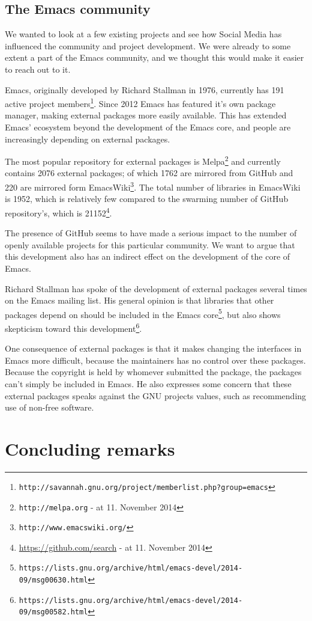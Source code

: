 \documentclass[a4paper,11pt]{article} %
\begin{document}
\subsection{The Emacs community}

We wanted to look at a few existing projects and see how Social Media has
influenced the community and project development. We were already to some
extent a part of the Emacs community, and we thought this would make it
easier to reach out to it.

Emacs, originally developed by Richard Stallman in 1976, currently has
\num{191} active project
members\footnote{\texttt{http://savannah.gnu.org/project/memberlist.php?group=emacs}}.
Since \num{2012} Emacs has featured it's own package manager, making
external packages more easily available. This has extended Emacs' ecosystem
beyond the development of the Emacs core, and people are increasingly
depending on external packages.

The most popular repository for external packages is
Melpa\footnote{\texttt{http://melpa.org} - at 11. November 2014} and
currently contains \num{2076} external packages; of which \num{1762} are
mirrored from GitHub and \num{220} are mirrored form
EmacsWiki\footnote{\texttt{http://www.emacswiki.org/}}. The total number of
libraries in EmacsWiki is \num{1952}, which is relatively few compared to
the swarming number of GitHub repository's, which is
\num{21152}\footnote{\href{https://github.com/search?utf8=\%E2\%9C\%93\&q=language\%3Aemacs-lisp\&type=Repositories\&ref=searchresults}{https://github.com/search} - at 11. November 2014}.

The presence of GitHub seems to have made a serious impact to the number of
openly available projects for this particular community. We want to argue
that this development also has an indirect effect on the development of the
core of Emacs.

Richard Stallman has spoke of the development of external packages several
times on the Emacs mailing list. His general opinion is that libraries that
other packages depend on should be included in the Emacs
core\footnote{\texttt{https://lists.gnu.org/archive/html/emacs-devel/2014-09/msg00630.html}},
but also shows skepticism toward this
development\footnote{\texttt{https://lists.gnu.org/archive/html/emacs-devel/2014-09/msg00582.html}}.

One consequence of external packages is that it makes changing the
interfaces in Emacs more difficult, because the maintainers has no control
over these packages. Because the copyright is held by whomever submitted the
package, the packages can't simply be included in Emacs. He also expresses
some concern that these external packages speaks against the GNU projects
values, such as recommending use of non-free software.

\section{Concluding remarks}

\newpage
\printbibliography
\end{document}
